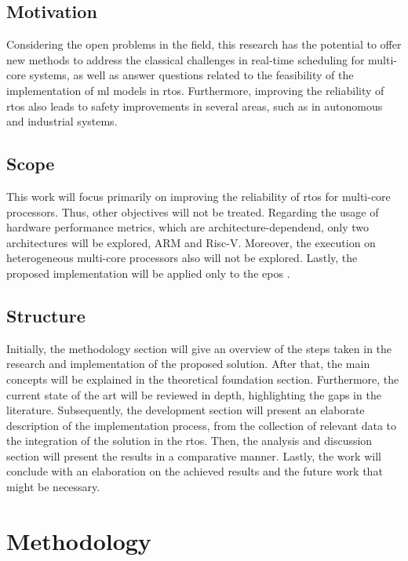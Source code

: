 \documentclass[journal,onecolumn]{IEEEtran}
\begin{document}
\subsection{Motivation}

Considering the open problems in the field, this research has the potential to offer new methods to address the classical challenges in real-time scheduling for multi-core systems, as well as answer questions related to the feasibility of the implementation of \gls{ml} models in \gls{rtos}. Furthermore, improving the reliability of \gls{rtos} also leads to safety improvements in several areas, such as in autonomous and industrial systems.

\subsection{Scope}

This work will focus primarily on improving the reliability of \gls{rtos} for multi-core processors. Thus, other objectives will not be treated. Regarding the usage of hardware performance metrics, which are architecture-dependend, only two architectures will be explored, ARM and Risc-V. Moreover, the execution on heterogeneous multi-core processors also will not be explored. Lastly, the proposed implementation will be applied only to the \gls{epos} \cite{epos}.

\subsection{Structure}

Initially, the methodology section will give an overview of the steps taken in the research and implementation of the proposed solution. After that, the main concepts will be explained in the theoretical foundation section. Furthermore, the current state of the art will be reviewed in depth, highlighting the gaps in the literature. Subsequently, the development section will present an elaborate description of the implementation process, from the collection of relevant data to the integration of the solution in the \gls{rtos}. Then, the analysis and discussion section will present the results in a comparative manner. Lastly, the work will conclude with an elaboration on the achieved results and the future work that might be necessary.

\section{Methodology}
\end{document}
